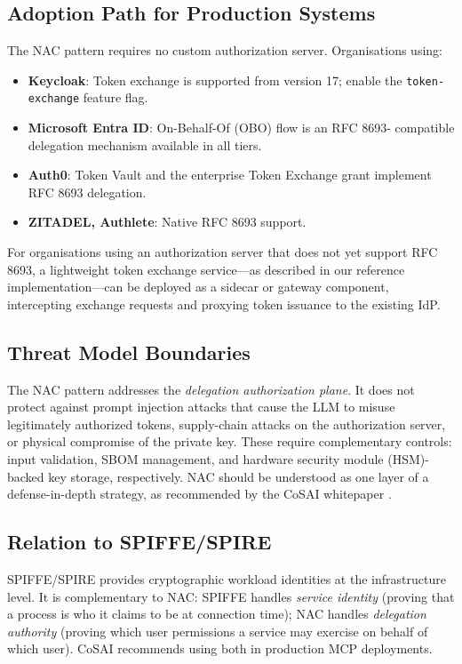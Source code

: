 \documentclass[journal]{IEEEtran}
\begin{document}
\subsection{Adoption Path for Production Systems}

The NAC pattern requires no custom authorization server. Organisations using:
\begin{itemize}
  \item \textbf{Keycloak}: Token exchange is supported from version 17; enable
        the \texttt{token-exchange} feature flag.
  \item \textbf{Microsoft Entra ID}: On-Behalf-Of (OBO) flow is an RFC 8693-
        compatible delegation mechanism available in all tiers.
  \item \textbf{Auth0}: Token Vault and the enterprise Token Exchange
        grant implement RFC 8693 delegation.
  \item \textbf{ZITADEL, Authlete}: Native RFC 8693 support.
\end{itemize}

For organisations using an authorization server that does not yet support RFC 8693,
a lightweight token exchange service---as described in our reference
implementation---can be deployed as a sidecar or gateway component, intercepting
exchange requests and proxying token issuance to the existing IdP.

\subsection{Threat Model Boundaries}

The NAC pattern addresses the \textit{delegation authorization plane}. It does
not protect against prompt injection attacks that cause the LLM to misuse
legitimately authorized tokens, supply-chain attacks on the authorization server,
or physical compromise of the private key. These require complementary controls:
input validation, SBOM management, and hardware security module (HSM)-backed
key storage, respectively. NAC should be understood as one layer of a
defense-in-depth strategy, as recommended by the CoSAI whitepaper \cite{cosai_mcp}.

\subsection{Relation to SPIFFE/SPIRE}

SPIFFE/SPIRE \cite{spiffe} provides cryptographic workload identities at the
infrastructure level. It is complementary to NAC: SPIFFE handles
\textit{service identity} (proving that a process is who it claims to be at
connection time); NAC handles \textit{delegation authority} (proving which
user permissions a service may exercise on behalf of which user). CoSAI
\cite{cosai_mcp} recommends using both in production MCP deployments.
\end{document}
